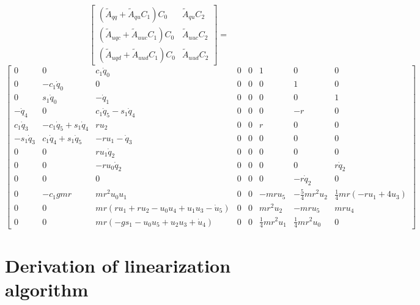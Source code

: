 \documentclass[smallcondensed]{svjour3}                     %
\begin{document}
\begin{equation*}
   \left[
     \begin{array}{cc}
       (\tilde{A}_{qq} + \tilde{A}_{qu} C_1 ) C_0 & \tilde{A}_{qu} C_2 \\
       (\tilde{A}_{uqc} + \tilde{A}_{uuc} C_1 ) C_0 & \tilde{A}_{uuc} C_2\\
       (\tilde{A}_{uqd} + \tilde{A}_{uud} C_1 ) C_0 & \tilde{A}_{uud} C_2
     \end{array}
   \right]=
\end{equation*}
\begin{equation}
\left[\begin{smallmatrix}0 & 0 & c_{1} \dot{q}_{0} & 0 & 0 & 1 & 0 & 0\\0 & - c_{1} \dot{q}_{0} & 0 & 0 & 0 & 0 & 1 & 0\\0 & s_{1} \dot{q}_{0} & - \dot{q}_{1} & 0 & 0 & 0 & 0 & 1\\- \dot{q}_{4} & 0 & c_{1} \dot{q}_{5} - s_{1} \dot{q}_{4} & 0 & 0 & 0 & - r & 0\\c_{1} \dot{q}_{3} & - c_{1} \dot{q}_{5} + s_{1} \dot{q}_{4} & r u_{2} & 0 & 0 & r & 0 & 0\\- s_{1} \dot{q}_{3} & c_{1} \dot{q}_{4} + s_{1} \dot{q}_{5} & - r u_{1} - \dot{q}_{3} & 0 & 0 & 0 & 0 & 0\\0 & 0 & r u_{1} \dot{q}_{2} & 0 & 0 & 0 & 0 & 0\\0 & 0 & - r u_{0} \dot{q}_{2} & 0 & 0 & 0 & 0 & r \dot{q}_{2}\\0 & 0 & 0 & 0 & 0 & 0 & - r \dot{q}_{2} & 0\\0 & - c_{1} g m r & m r^{2} u_{0} u_{1} & 0 & 0 & - m r u_{5} & - \frac{5}{4} m r^{2} u_{2} & \frac{1}{4} m r \left(- r u_{1} + 4 u_{3}\right)\\0 & 0 & m r \left(r u_{1} + r u_{2} - u_{0} u_{4} + u_{1} u_{3} - \dot{u}_{5}\right) & 0 & 0 & m r^{2} u_{2} & - m r u_{5} & m r u_{4}\\0 & 0 & m r \left(- g s_{1} - u_{0} u_{5} + u_{2} u_{3} + \dot{u}_{4}\right) & 0 & 0 & \frac{1}{4} m r^{2} u_{1} & \frac{1}{4} m r^{2} u_{0} & 0\end{smallmatrix}\right]
\end{equation}



\section{Derivation of linearization algorithm}
\label{sec:derivations}
\end{document}
